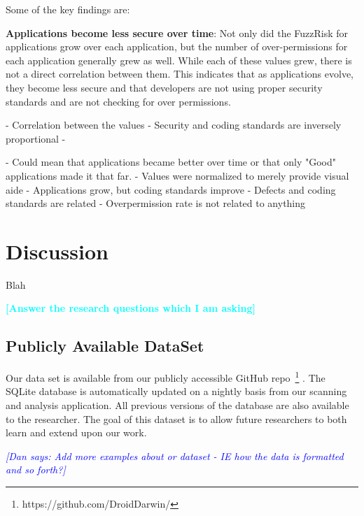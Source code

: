 \documentclass{sig-alternate}
\newcommand{\todo}[1]{\textcolor{cyan}{\textbf{[#1]}}}
\newcommand{\dan}[1]{\textcolor{blue}{{\it [Dan says: #1]}}}
\begin{document}
Some of the key findings are:

\textbf{Applications become less secure over time}: Not only did the FuzzRisk for applications grow over each application, but the number of over-permissions for each application generally grew as well. While each of these values grew, there is not a direct correlation between them. This indicates that as applications evolve, they become less secure and that developers are not using proper security standards and are not checking for over permissions.

- Correlation between the values
- 	Security and coding standards are inversely proportional
-	






- Could mean that applications became better over time or that only "Good" applications made it that far.
- Values were normalized to merely provide visual aide
- Applications grow, but coding standards improve
- Defects and coding standards are related
- Overpermission rate is not related to anything



\label{sec: discussion}
\section{Discussion}




Blah



\todo{Answer the research questions which I am asking}

\subsection{Publicly Available DataSet}

Our data set is available from our publicly accessible GitHub repo~\footnote{https://github.com/DroidDarwin/} . The SQLite database is automatically updated on a nightly basis from our scanning and analysis application. All previous versions of the database are also available to the researcher. The goal of this dataset is to allow future researchers to both learn and extend upon our work.

\dan{Add more examples about or dataset - IE how the data is formatted and so forth?}
\end{document}

